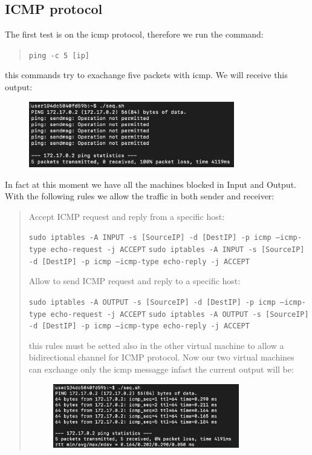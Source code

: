 \documentclass[11pt]{article}
\begin{document}
\subsection{ICMP protocol}
The first test is on the icmp protocol, therefore we run the command:

\begin{quote}
 \texttt{ping -c 5 [ip]}\newline
\end{quote}

this commands try to exachange five packets with icmp. We will receive this output:

\begin{figure}[!ht]
 \centering
 \includegraphics[width=0.8\textwidth]{pic3-hw8-1635747.png}
 \label{fig:conf}
\end{figure}

In fact at this moment we have all the machines blocked in Input and Output. With the following rules we allow the traffic in both sender and receiver:

\begin{quote}
 Accept ICMP request and reply from a specific host:

 \texttt{sudo iptables -A INPUT -s [SourceIP] -d [DestIP] -p icmp --icmp-type echo-request -j ACCEPT}\newline
 \texttt{sudo iptables -A INPUT -s [SourceIP] -d [DestIP] -p icmp --icmp-type echo-reply -j ACCEPT}\newline

 Allow to send ICMP request and reply to a specific host:

 \texttt{sudo iptables -A OUTPUT -s [SourceIP] -d [DestIP] -p icmp --icmp-type echo-request -j ACCEPT}\newline
 \texttt{sudo iptables -A OUTPUT -s [SourceIP] -d [DestIP] -p icmp --icmp-type echo-reply -j ACCEPT}\newline

 this rules must be setted also in the other virtual machine to allow a bidirectional channel for ICMP protocol. Now our two virtual machines can exchange only the icmp messagge infact the current output will be:

 \begin{figure}[!ht]
 \centering
 \includegraphics[width=0.8\textwidth]{pic4-hw8-1635747.png}
 \label{fig:conf}
 \end{figure}
\end{quote}
\end{document}
